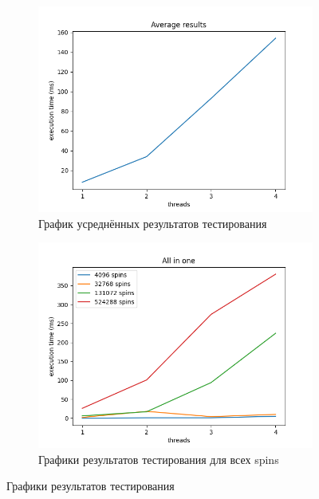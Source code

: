 \begin{figure}[H]
    \centering
    \begin{subfigure}[b]{0.45\textwidth}
        \includegraphics[width=\linewidth]{photo/plot_mid}
        \caption{График усреднённых результатов тестирования}
        \label{fig:plot_mid}
    \end{subfigure}
    \hfill
    \begin{subfigure}[b]{0.45\textwidth}
        \includegraphics[width=\linewidth]{photo/all_in_one}
        \caption{Графики результатов тестирования для всех spins}
        \label{fig:all_in_one}
    \end{subfigure}
    \caption{Графики результатов тестирования}
\end{figure}
